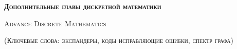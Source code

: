 

\setdefaultlanguage[spelling = modern]{russian}

\thispagestyle{empty}


\centerline{\large \textsc{\textbf{Дополнительные главы дискретной математики}}}
\centerline{\textsc{Advance Discrete Mathematics}}
\centerline{\small \textsc{(Ключевые слова: экспандеры, коды исправляющие ошибки, спектр графа)}}

\bigskip



\vspace{1cm}

%    

\nocite{*}
%
%
\printbibliography




